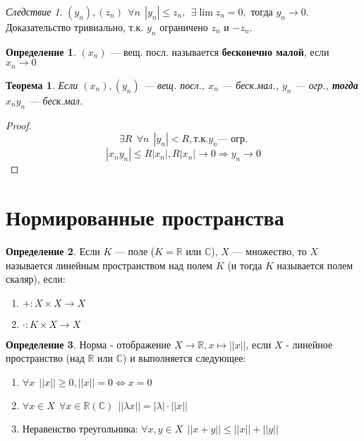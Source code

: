 \documentclass[12pt]{article}
\theoremstyle{plain}
\newtheorem{theorem}{Теорема}
\theoremstyle{remark}
\newtheorem*{consequence}{Следствие}
\theoremstyle{definition}
\newtheorem*{definition}{Определение}
\begin{document}
\begin{consequence}
$(y_n), (z_n) \ \ \forall n \ \ |y_n|\leq z_n, \ \ \exists \lim z_n=0, \text{ тогда } y_n\to 0$. Доказательство тривиально, т.к. $y_n$ ограничено $z_n$ и $-z_n$.
\end{consequence}

\begin{definition}
$(x_n)$ --- вещ. посл. называется \textbf{бесконечно малой}, если $x_n\to 0$
\end{definition}

\begin{theorem}
Если $(x_n),(y_n)$ --- вещ. посл., $x_n$ --- беск.мал., $y_n$ --- огр., \textbf{тогда} $x_ny_n$ --- беск.мал.
\end{theorem}

\begin{proof}
$$\exists R \ \ \forall n \ \ |y_n|<R, \text{т.к.} y_n \text{--- огр.} $$
$$|x_ny_n|\leq R|x_n|, R|x_n|\to 0 \Rightarrow y_n\to0$$
\end{proof}

\section*{Нормированные пространства}

\begin{definition}
Если $K$ --- поле ($K=\mathbb{R}$ или $\mathbb{C}$), $X$ --- множество, то $X$ называется линейным пространством над полем $K$ (и тогда $K$ называется полем скаляр), если:
\begin{enumerate}
\item $+:X\times X \to X$
\item $\cdot:K\times X\to X$
\end{enumerate}
\end{definition}

\begin{definition}
Норма - отображение $X\to\mathbb{R}, x\mapsto ||x||$, если $X$ - линейное пространство (над $\mathbb{R}$ или $\mathbb{C}$) и выполняется следующее:
\begin{enumerate}
\item $\forall x \ \ ||x||\geq 0, ||x||=0\Leftrightarrow x=0$
\item $\forall x\in X \ \ \forall x\in\mathbb R(\mathbb{C}) \ \ ||\lambda x||=|\lambda|\cdot||x||$
\item Неравенство треугольника: $\forall x,y\in X \ \ ||x+y||\leq||x||+||y||$
\end{enumerate}
\end{definition}
\end{document}

